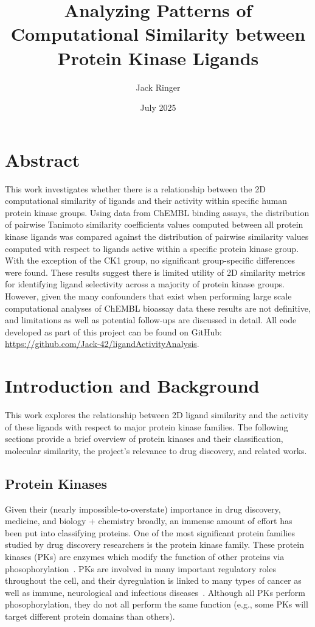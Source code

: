 \documentclass[11pt]{article}
\title{Analyzing Patterns of Computational Similarity between Protein Kinase Ligands}
\author{Jack Ringer}
\date{July 2025}
\begin{document}
\maketitle


\section*{Abstract}
This work investigates whether there is a relationship between the 2D computational similarity of ligands and their activity within specific human protein kinase groups.  
Using data from ChEMBL binding assays, the distribution of pairwise Tanimoto similarity coefficients values computed between all protein kinase ligands was compared against the distribution of pairwise similarity values computed with respect to ligands active within a specific protein kinase group. 
With the exception of the CK1 group, no significant group-specific differences were found. 
These results suggest there is limited utility of 2D similarity metrics for identifying ligand selectivity across a majority of protein kinase groups. 
However, given the many confounders that exist when performing large scale computational analyses of ChEMBL bioassay data these results are not definitive, and limitations as well as potential follow-ups are discussed in detail. 
All code developed as part of this project can be found on GitHub: \href{https://github.com/Jack-42/ligandActivityAnalysis}{https://github.com/Jack-42/ligandActivityAnalysis}. 

\section*{Introduction and Background}
This work explores the relationship between 2D ligand similarity and the activity of these ligands with respect to major protein kinase families. 
The following sections provide a brief overview of protein kinases and their classification, molecular similarity, the project's relevance to drug discovery, and related works.


\subsection*{Protein Kinases}
Given their (nearly impossible-to-overstate) importance in drug discovery, medicine, and biology + chemistry broadly, an immense amount of effort has been put into classifying proteins. 
One of the most significant protein families studied by drug discovery researchers is the protein kinase family. 
These protein kinases (PKs) are enzymes which modify the function of other proteins via phosophorylation~\cite{lubos_cipak_2022}. 
PKs are involved in many important regulatory roles throughout the cell, and their dyregulation is linked to many types of cancer as well as immune, neurological and infectious diseases~\cite{bhullar_lagaron_mcgowan_parmar_jha_hubbard_rupasinghe_2018}. 
Although all PKs perform phosophorylation, they do not all perform the same function (e.g., some PKs will target different protein domains than others). 
\end{document}

